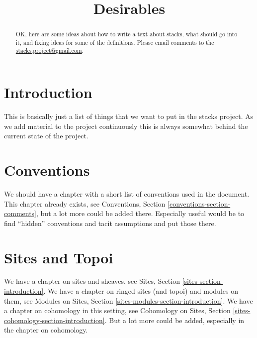 

%


\title{Desirables}

\begin{abstract}
OK, here are some ideas about how to write a text about
stacks, what should go into it, and fixing ideas for some
of the definitions. Please email comments to the
\href{mailto:stacks.project@gmail.com}{stacks.project@gmail.com}.
\end{abstract}

\maketitle

\label{section-phantom}


\tableofcontents

\section{Introduction}
\label{section-introduction}

\noindent
This is basically just a list of things that we want to put in the stacks
project. As we add material to the project continuously this is always
somewhat behind the current state of the project.


\section{Conventions}
\label{section-conventions}

\noindent
We should have a chapter with a short list of conventions used in the document.
This chapter already exists, see
Conventions, Section \ref{conventions-section-comments},
but a lot more could be added there. Especially useful would be to find
``hidden'' conventions and tacit assumptions and put those there.


\section{Sites and Topoi}
\label{section-sites}

\noindent
We have a chapter on sites and sheaves, see
Sites, Section \ref{sites-section-introduction}.
We have a chapter on ringed sites (and topoi) and modules on them, see
Modules on Sites, Section \ref{sites-modules-section-introduction}.
We have a chapter on cohomology in this setting, see
Cohomology on Sites, Section \ref{sites-cohomology-section-introduction}.
But a lot more could be added, especially in the chapter on cohomology.


